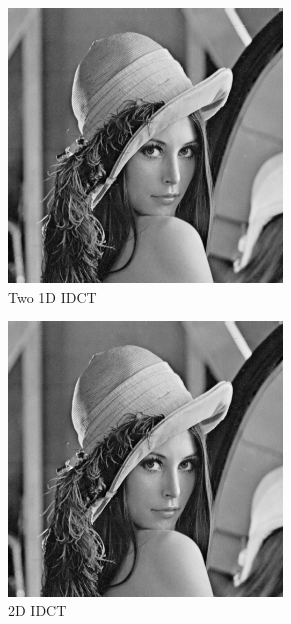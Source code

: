 \documentclass{homework}
\begin{document}
\begin{figure}[H]
    \centering
    \begin{subfigure}{0.32\textwidth}
        \centering
        \includegraphics[width=0.8\textwidth]{idct_1d.png}
        \caption{Two 1D IDCT}
    \end{subfigure}
    \begin{subfigure}{0.32\textwidth}
        \centering
        \includegraphics[width=0.8\textwidth]{idct_2d.png}
        \caption{2D IDCT}
    \end{subfigure}
    \begin{subfigure}{0.32\textwidth}

\end{subfigure}
\end{figure}
\end{document}
